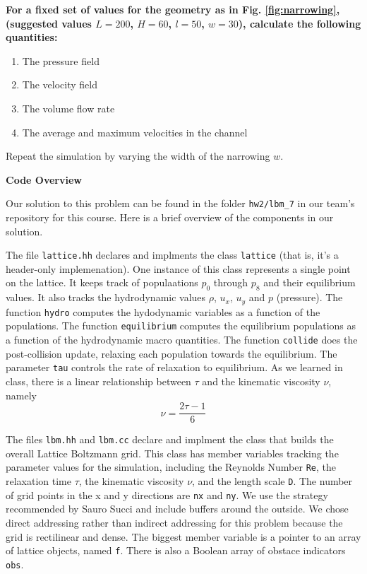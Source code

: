 \documentclass[11pt]{article}
\newcommand{\tty}[1]{\texttt{#1}}
\begin{document}
    
    \textbf{For a fixed set of values for the geometry 
    as in Fig. \ref{fig:narrowing}, (suggested values $L=200$, $H=60$, $l=50$, $w=30$), 
    calculate the following quantities:}
    \begin{enumerate}
      \item The pressure field
      \item The velocity field 
      \item The volume flow rate 
      \item The average and maximum velocities in the channel
    \end{enumerate}

    Repeat the simulation by varying the width of the narrowing $w$.

\textbf{Code Overview}

Our solution to this problem can be found in the folder \tty{hw2/lbm\_7}
in our team's repository for this course.  
Here is a brief overview of the components in our solution.

The file \tty{lattice.hh} declares and implments the class \tty{lattice}
(that is, it's a header-only implemenation).  
One instance of this class represents a single point on the lattice.
It keeps track of populaations $p_0$ through $p_8$ and their equilibrium values. 
It also tracks the hydrodynamic values $\rho$, $u_x$, $u_y$ and $p$ (pressure).
The function  \tty{hydro} computes the hydodynamic variables as a function of the populations.
The function \tty{equilibrium} computes the equilibrium populations as a function of the hydrodynamic macro quantities.
The function \tty{collide} does the post-collision update, relaxing each population towards the equilibrium.
The parameter \tty{tau} controls the rate of relaxation to equilibrium.
As we learned in class, there is a linear relationship between $\tau$ and the kinematic viscosity $\nu$, namely
$$\nu = \frac{2\tau-1}{6}$$

The files \tty{lbm.hh} and \tty{lbm.cc} declare and implment the class that builds
the overall Lattice Boltzmann grid.  
This class has member variables tracking the parameter values for the simulation, including
the Reynolds Number \tty{Re}, the relaxation time $\tau$, 
the kinematic viscosity $\nu$, and the length scale \tty{D}.  
The number of grid points in the x and y directions are \tty{nx} and \tty{ny}.
We use the strategy recommended by Sauro Succi and include buffers around the outside.
We chose direct addressing rather than indirect addressing for this problem because the
grid is rectilinear and dense.
The biggest member variable is a pointer to an array of lattice objects, named \tty{f}.
There is also a Boolean array of obstace indicators \tty{obs}.
\end{document}
